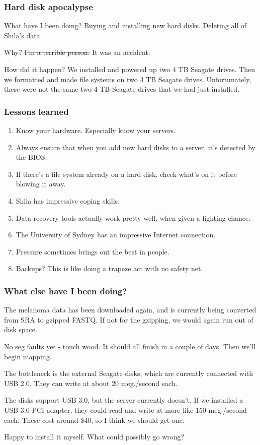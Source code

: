\documentclass{beamer}
\begin{document}
\begin{frame}
\frametitle{Hard disk apocalypse}
What have I been doing? Buying and installing new hard disks. Deleting all of Shila's data.

Why? \st{I'm a terrible person. }It was an accident.

How did it happen? We installed and powered up two 4 TB Seagate drives. Then we formatted and made file systems on two 4 TB Seagate drives. Unfortunately, these were not the same two 4 TB Seagate drives that we had just installed.
\end{frame}

\begin{frame}
\frametitle{Lessons learned}
\begin{enumerate}
\item Know your hardware. Especially know your servers.
\item Always ensure that when you add new hard disks to a server, it's detected by the BIOS.
\item If there's a file system already on a hard disk, check what's on it before blowing it away.
\item Shila has impressive coping skills.
\item Data recovery tools actually work pretty well, when given a fighting chance.
\item The University of Sydney has an impressive Internet connection.
\item Pressure sometimes brings out the best in people.
\item Backups? This is like doing a trapeze act with no safety net.
\end{enumerate}
\end{frame}

\begin{frame}
\frametitle{What else have I been doing?}
The melanoma data has been downloaded again, and is currently being converted from SRA to
gzipped FASTQ. If not for the gzipping, we would again run out of disk space.

No seg faults yet - touch wood. It should all finish in a couple of days. Then we'll begin 
mapping.

The bottleneck is the external Seagate disks, which are currently connected with USB 2.0. 
They can write at about 20 meg./second each.

The disks support USB 3.0, but the server currently doesn't. If we installed a USB 3.0 PCI 
adapter, they could read and write at more like 150 meg./second each. These cost around 
\$40, so I think we should get one.

Happy to install it myself. What could possibly go wrong?
\end{frame}
\end{document}
